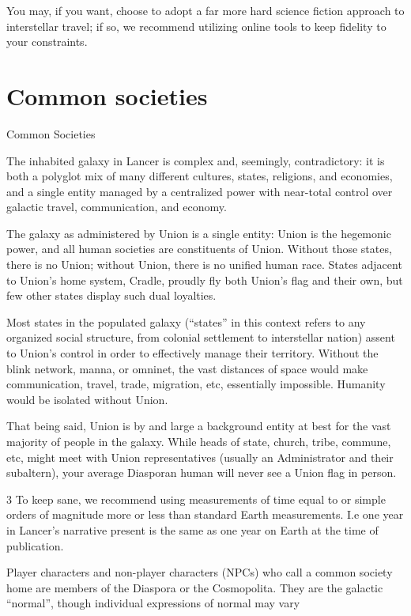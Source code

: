You may, if you want, choose to adopt a far more hard science fiction approach to interstellar
travel; if so, we recommend utilizing online tools to keep fidelity to your constraints.




\section{Common societies}
Common Societies

The inhabited galaxy in Lancer is complex and, seemingly, contradictory: it is both a polyglot mix
of many different cultures, states, religions, and economies, and a single entity managed by a
centralized power with near-total control over galactic travel, communication, and economy.


The galaxy as administered by Union is a single entity: Union is the hegemonic power, and all
human societies are constituents of Union. Without those states, there is no Union; without
Union, there is no unified human race. States adjacent to Union’s home system, Cradle, proudly
fly both Union’s flag and their own, but few other states display such dual loyalties.


Most states in the populated galaxy (“states” in this context refers to any organized social
structure, from colonial settlement to interstellar nation) assent to Union’s control in order to
effectively manage their territory. Without the blink network, manna, or omninet, the vast
distances of space would make communication, travel, trade, migration, etc, essentially
impossible. Humanity would be isolated without Union.


That being said, Union is by and large a background entity at best for the vast majority of people
in the galaxy. While heads of state, church, tribe, commune, etc, might meet with Union
representatives (usually an Administrator and their subaltern), your average Diasporan human will
never see a Union flag in person.


3 To keep sane, we recommend using measurements of time equal to or simple orders of magnitude more
or less than standard Earth measurements. I.e one year in Lancer’s narrative present is the same as one
year on Earth at the time of publication.




Player characters and non-player characters (NPCs) who call a common society home are
members of the Diaspora or the Cosmopolita. They are the galactic “normal”, though individual
expressions of normal may vary


